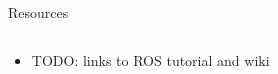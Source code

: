 \documentclass[aspectratio=43]{beamer}
\begin{document}

\begin{frame}{Resources}
  \begin{columns}
	\begin{column}{0.6\textwidth}
	  \begin{itemize}
		\item TODO: links to ROS tutorial and wiki
	  \end{itemize}
	\end{column}
  \begin{column}{0.4\textwidth}
		\centering
	\end{column}
  \end{columns}
\end{frame}


\end{document}
